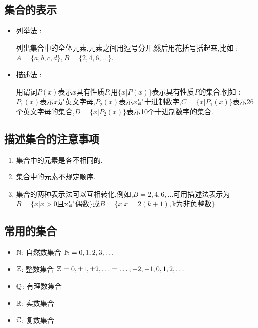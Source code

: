 {{\subsection{集合的表示}{
  \begin{itemize}
    \item {
          列举法 :

          列出集合中的全体元素,元素之间用逗号分开,然后用花括号括起来,比如 : $A = \{a,b,c,d\},B = \{2,4,6,\dots\}$.
          }
    \item {
          描述法 :

          用谓词$P(x)$表示$x$具有性质$P$,用$\{x | P(x)\}$表示具有性质$P$的集合.例如 : $P_1(x)$表示$x$是英文字母,$P_2(x)$表示$x$是十进制数字,$C = \{x | P_1(x)\}$表示26个英文字母的集合,$D = \{x | P_2(x)\}$表示10个十进制数字的集合.
          }
  \end{itemize}
}%

\subsection{描述集合的注意事项}{
  \begin{enumerate}
    \item 集合中的元素是各不相同的.
    \item 集合中的元素不规定顺序.
    \item {
          集合的两种表示法可以互相转化,例如,$B={2,4,6,...}$可用描述法表示为$B=\{x|x>0\mbox{且x是偶数}\}$或$B=\{x|x=2(k+1),\mbox{k为非负整数}\}$.
          }
  \end{enumerate}
}%

\subsection{常用的集合}{
  \begin{itemize}
    \item $\operatorname{\mathbb{N}}$: 自然数集合 $\operatorname{\mathbb{N}} = {0,1,2,3,\dots}$
    \item $\operatorname{\mathbb{Z}}$: 整数集合 $\operatorname{\mathbb{Z}} = {0, \pm 1, \pm 2, \dots} = {\dots, -2, -1, 0, 1, 2, \dots}$
    \item $\operatorname{\mathbb{Q}}$: 有理数集合
    \item $\operatorname{\mathbb{R}}$: 实数集合
    \item $\operatorname{\mathbb{C}}$: 复数集合
  \end{itemize}
}%

}}
